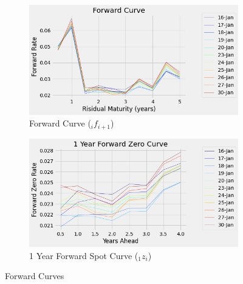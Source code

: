 \documentclass{article}
\begin{document}
\begin{enumerate}
\begin{enumerate}
            \begin{figure}[H]
            \begin{subfigure}{0.5\textwidth}
            \includegraphics[width=\linewidth]{forward_curve.png}
            \caption{Forward Curve (${}_{i}f_{i+1}$)}
            \end{subfigure}
            \begin{subfigure}{0.5\textwidth}
            \includegraphics[width=\linewidth]{forward_curve_1.png}
            \caption{1 Year Forward Spot Curve (${}_{1}z_{i}$)}
            \end{subfigure}
            \caption{Forward Curves}
            \label{fig:Forward Curves}
            \end{figure}


\end{enumerate}
\end{enumerate}
\end{document}
